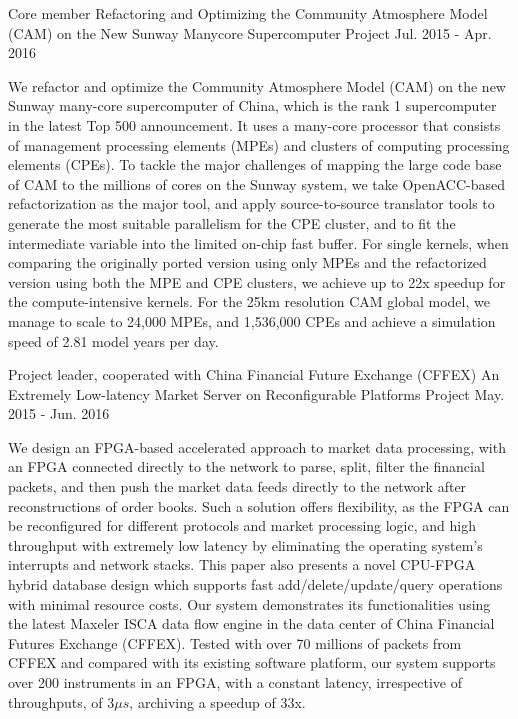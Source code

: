 \documentclass[11pt, a4paper]{awesome-cv}
\begin{document}
\begin{cventries}
  \cventry
    {Core member} %
    {Refactoring and Optimizing the Community Atmosphere Model (CAM) on the New Sunway Manycore Supercomputer} %
    {Project} %
    {Jul. 2015 - Apr. 2016} %
    {
      \begin{cvitems} %
        \item {We refactor and optimize the Community Atmosphere Model (CAM) on the new Sunway many-core supercomputer of China, which is the rank 1 supercomputer in the latest Top 500 announcement. It uses a many-core processor that consists of management processing elements (MPEs) and clusters of computing processing elements (CPEs). To tackle the major challenges of mapping the large code base of CAM to the millions of cores on the Sunway system, we take OpenACC-based refactorization as the major tool, and apply source-to-source translator tools to generate the most suitable parallelism for the CPE cluster, and to fit the intermediate variable into the limited on-chip fast buffer. For single kernels, when comparing the originally ported version using only MPEs and the refactorized version using both the MPE and CPE clusters, we achieve up to 22x speedup for the compute-intensive kernels. For the 25km resolution CAM global model, we manage to scale to 24,000 MPEs, and 1,536,000 CPEs and achieve a simulation speed of 2.81 model years per day.}
      \end{cvitems}
    }

  \cventry
    {Project leader, cooperated with China Financial Future Exchange (CFFEX)} %
    {An Extremely Low-latency Market Server on Reconfigurable Platforms} %
    {Project} %
    {May. 2015 - Jun. 2016} %
    {
      \begin{cvitems} %
        \item {We design an FPGA-based accelerated approach to market data processing, with an FPGA connected directly to the network to parse, split, filter the financial packets, and then push the market data feeds directly to the network after reconstructions of order books. Such a solution offers flexibility, as the FPGA can be reconfigured for different protocols and market processing logic, and high throughput with extremely low latency by eliminating the operating system's interrupts and network stacks. This paper also presents a novel CPU-FPGA hybrid database design which supports fast add/delete/update/query operations with minimal resource costs. Our system demonstrates its functionalities using the latest Maxeler ISCA data flow engine in the data center of China Financial Futures Exchange (CFFEX). Tested with over 70 millions of packets from CFFEX and compared with its existing software platform, our system supports over 200 instruments in an FPGA, with a constant latency, irrespective of throughputs, of $3\mu s$, archiving a speedup of 33x.}
      \end{cvitems}
    }


\end{cventries}
\end{document}
